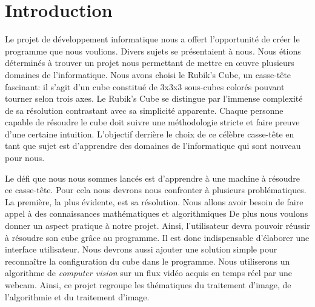 \chapter*{Introduction}

Le projet de développement informatique nous a offert l'opportunité de créer le programme que nous voulions.
Divers sujets se présentaient à nous. Nous étions déterminés à trouver un projet nous permettant de mettre en œuvre plusieurs domaines de l'informatique.
Nous avons choisi le Rubik's Cube, un casse-tête fascinant: il s'agit d'un cube constitué de 3x3x3 sous-cubes colorés pouvant tourner selon trois axes.
Le Rubik's Cube se distingue par l'immense complexité de sa résolution contrastant avec sa simplicité apparente.
Chaque personne capable de résoudre le cube doit suivre une méthodologie stricte et faire preuve d'une certaine intuition.
L'objectif derrière le choix de ce célèbre casse-tête en tant que sujet est d'apprendre des domaines de l'informatique qui sont nouveau pour nous.

Le défi que nous nous sommes lancés est d'apprendre à une machine à résoudre ce casse-tête.
Pour cela nous devrons nous confronter à plusieurs problématiques.
La première, la plus évidente, est sa résolution. Nous allons avoir besoin de faire appel à des connaissances mathématiques et algorithmiques\cite{cite1}
De plus nous voulons donner un aspect pratique à notre projet. Ainsi, l'utilisateur devra pouvoir réussir à résoudre son cube grâce au programme.
Il est donc indispensable d'élaborer une interface utilisateur.
Nous devrons aussi ajouter une solution simple pour reconnaître la configuration du cube dans le programme. Nous utiliserons un algorithme de \textit{computer vision} sur un flux vidéo acquis en temps réel par une webcam.
Ainsi, ce projet regroupe les thématiques du traitement d'image, de l'algorithmie et du traitement d'image.

